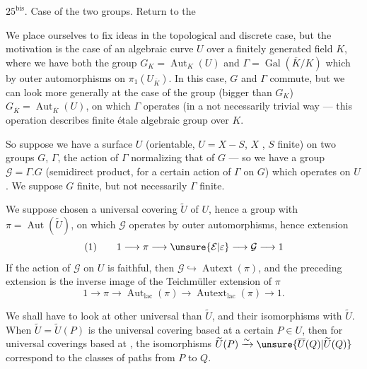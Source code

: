 $25^{\mathrm{bis}}$. Case of the two groups. Return to the 

We place ourselves  to fix ideas in the
topological and discrete case, but the motivation is
the case of an algebraic curve $U$ over a
finitely generated field $K$, where we have both
the group $G_K=\operatorname{Aut}_K(U)$ and $\Gamma=\operatorname{Gal}(\overline K/K)$
which  by outer automorphisms on $\pi_1(U_{\overline K})$.
In this case, $G$ and $\Gamma$ commute, but
we can look more generally at the case
of the group (bigger than $G_K$) $G_{\overline K}=\operatorname{Aut}_{\overline K}(U)$,
on which $\Gamma$ operates (in a not necessarily trivial way
--- this operation describes  finite étale
algebraic group over $K$.

So suppose we have a surface
$U$ (orientable, $U=X-S$, $X$  , $S$ finite)
on   two groups $G$, $\Gamma$,
the action of $\Gamma$ normalizing that of $G$
--- so we have a group $\mathcal G=\Gamma . G$ (semidirect
product, for a certain action of $\Gamma$
on $G$) which operates on $U$. We suppose $G$
finite, but not necessarily $\Gamma$ finite.


We suppose chosen a universal covering $\widetilde U$ of $U$, hence a group with  $\pi=\operatorname{Aut}(\widetilde U)$, on which $\mathcal G$ operates by outer automorphisms, hence extension
\[
(1)\qquad 1\longrightarrow\pi\longrightarrow\unsure{\mathcal E|\varepsilon}\longrightarrow\mathcal G\longrightarrow 1
\]
If the action of $\mathcal G$ on $U$  is faithful,
then $\mathcal G\hookrightarrow\operatorname{Autext}(\pi)$, and the preceding extension is the inverse image of the Teichmüller extension of $\pi$
\[
1\longrightarrow\pi\longrightarrow\operatorname{Aut}_{\mathrm{lac}}(\pi)\longrightarrow\operatorname{Autext}_{\mathrm{lac}}(\pi)\longrightarrow 1.
\]

 We shall have to look at other universal  than $\widetilde U$, and their isomorphisms with $\widetilde U$.
When $\widetilde U=\widetilde U(P)$ is the universal covering based at a certain $P\in U$, then for universal coverings  based at   ,
the isomorphisms $\widetilde U(P)\xrightarrow{\sim}\unsure{\overline U(Q)|\widetilde U(Q)}$ correspond  to the classes of paths from $P$ to $Q$.

